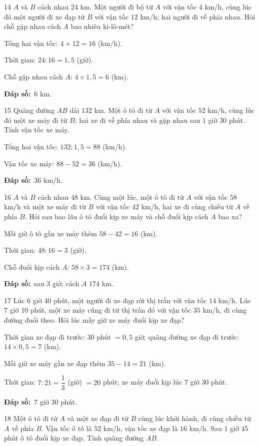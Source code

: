 \documentclass[11pt]{article}
\newif\ifsol \solfalse
\providecommand{\AnsWord}{Đáp số}
\newcommand{\dapso}[1]{\par\textbf{\AnsWord:}\ #1}
\newcommand{\probsol}[1]{%
  \begin{lrbox}{\solmeasure}\begin{minipage}{\dimexpr\linewidth-24pt\relax}#1\end{minipage}\end{lrbox}%
  \ifsol
    \begin{solbox}#1\end{solbox}%
  \else
    \setlength{\solht}{\dimexpr\ht\solmeasure+\dp\solmeasure+0.85cm\relax}%
    \ifdim\solht<1.35cm\setlength{\solht}{1.35cm}\fi
    \begin{tcolorbox}[colback=white,colframe=Line,boxrule=0.8pt,arc=5pt,
      left=8pt,right=8pt,top=4pt,bottom=4pt,height=\solht]{\footnotesize\color{Slate}\itshape\WorkWord}\end{tcolorbox}%
  \fi}
\newcommand{\gap}{\vspace{0.3cm}}
\def\WorkWord{Bài làm:}
\def\AnsWord{Đáp số}
\begin{document}
\gap
\begin{probbox}{14}{\relax}
$A$ và $B$ cách nhau $24$ km. Một người đi bộ từ $A$ với vận tốc $4$ km/h, cùng lúc đó một người đi xe đạp từ $B$ với vận tốc $12$ km/h; hai người đi về phía nhau. Hỏi chỗ gặp nhau cách $A$ bao nhiêu ki-lô-mét?
\end{probbox}
\probsol{
Tổng hai vận tốc: $4+12=16$ (km/h).\par Thời gian: $24:16=1{,}5$ (giờ).\par Chỗ gặp nhau cách $A$: $4\times1{,}5=6$ (km).
\dapso{$6$ km.}}
\gap
\begin{probbox}{15}{\relax}
Quãng đường $AB$ dài $132$ km. Một ô tô đi từ $A$ với vận tốc $52$ km/h, cùng lúc đó một xe máy đi từ $B$; hai xe đi về phía nhau và gặp nhau sau $1$ giờ $30$ phút. Tính vận tốc xe máy.
\end{probbox}
\probsol{
Tổng hai vận tốc: $132:1{,}5=88$ (km/h).\par Vận tốc xe máy: $88-52=36$ (km/h).
\dapso{$36$ km/h.}}
\gap
\begin{probbox}{16}{\relax}
$A$ và $B$ cách nhau $48$ km. Cùng một lúc, một ô tô đi từ $A$ với vận tốc $58$ km/h và một xe máy đi từ $B$ với vận tốc $42$ km/h, hai xe đi cùng chiều từ $A$ về phía $B$. Hỏi sau bao lâu ô tô đuổi kịp xe máy và chỗ đuổi kịp cách $A$ bao xa?
\end{probbox}
\probsol{
Mỗi giờ ô tô gần xe máy thêm $58-42=16$ (km).\par Thời gian: $48:16=3$ (giờ).\par Chỗ đuổi kịp cách $A$: $58\times3=174$ (km).
\dapso{sau $3$ giờ; cách $A$ $174$ km.}}
\gap
\begin{probbox}{17}{\relax}
Lúc 6 giờ 40 phút, một người đi xe đạp rời thị trấn với vận tốc $14$ km/h. Lúc 7 giờ 10 phút, một xe máy cũng đi từ thị trấn đó với vận tốc $35$ km/h, đi cùng đường đuổi theo. Hỏi lúc mấy giờ xe máy đuổi kịp xe đạp?
\end{probbox}
\probsol{
Thời gian xe đạp đi trước: $30$ phút $=0{,}5$ giờ; quãng đường xe đạp đi trước: $14\times0{,}5=7$ (km).\par
Mỗi giờ xe máy gần xe đạp thêm $35-14=21$ (km).\par Thời gian: $7:21=\dfrac13$ (giờ) $=20$ phút; xe máy đuổi kịp lúc 7 giờ 30 phút.
\dapso{7 giờ 30 phút.}}
\gap
\begin{probbox}{18}{\relax}
Một ô tô đi từ $A$ và một xe đạp đi từ $B$ cùng lúc khởi hành, đi cùng chiều từ $A$ về phía $B$. Vận tốc ô tô là $52$ km/h, vận tốc xe đạp là $16$ km/h. Sau $1$ giờ $45$ phút ô tô đuổi kịp xe đạp. Tính quãng đường $AB$.
\end{probbox}
\end{document}
